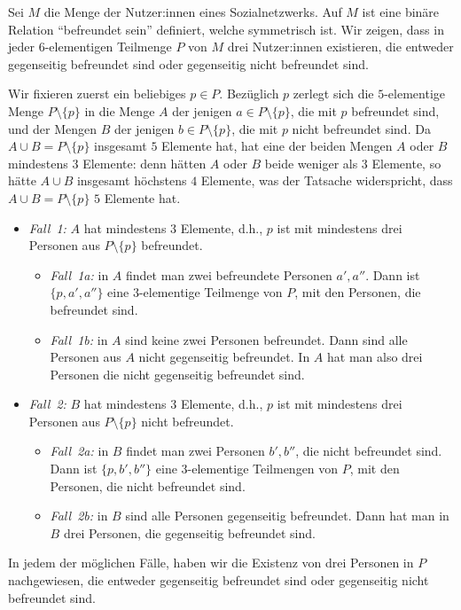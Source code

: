 \begin{bsp} 
	Sei $M$ die Menge der Nutzer:innen eines Sozialnetzwerks. Auf $M$ ist eine binäre Relation ``befreundet sein''  definiert, welche symmetrisch ist. Wir zeigen, dass in jeder $6$-elementigen Teilmenge $P$ von $M$ drei Nutzer:innen existieren, die entweder gegenseitig befreundet sind oder gegenseitig nicht befreundet sind. 
	
	Wir fixieren zuerst ein beliebiges $p \in P$. Bezüglich $p$ zerlegt sich die $5$-elementige Menge $P \setminus \{p\}$ in die Menge $A$ der jenigen $a \in P \setminus \{p\}$, die mit $p$ befreundet sind, und der Mengen $B$ der jenigen $b \in P \setminus \{p\}$, die mit $p$ nicht befreundet sind. Da $A \cup B = P \setminus \{p\}$ insgesamt $5$ Elemente hat, hat eine der beiden Mengen $A$ oder $B$ mindestens $3$ Elemente: denn hätten $A$ oder $B$ beide weniger als $3$ Elemente, so hätte $A \cup B$ insgesamt höchstens $4$ Elemente, was der Tatsache widerspricht, dass $A \cup B = P \setminus \{p\}$ $5$ Elemente hat. 
	
	\begin{itemize} 
		\item[] \emph{Fall~1:} $A$ hat mindestens $3$ Elemente, d.h., $p$ ist mit mindestens drei Personen aus  $P \setminus \{p\}$ befreundet. 
		\begin{itemize} 
			\item[] \emph{Fall~1a:}  in $A$ findet man zwei befreundete Personen $a', a''$. Dann ist $\{p,a',a''\}$ eine $3$-elementige Teilmenge von $P$, mit den Personen, die befreundet sind. 
			\item[] \emph{Fall~1b:} in $A$ sind  keine zwei Personen befreundet. Dann sind alle Personen aus $A$ nicht gegenseitig befreundet. In $A$ hat man also drei Personen die nicht gegenseitig befreundet sind. 
		\end{itemize} 
		\item[] \emph{Fall~2:} $B$ hat mindestens $3$ Elemente, d.h., $p$ ist mit mindestens drei Personen aus $P \setminus \{p\}$ nicht befreundet. 
		\begin{itemize} 
				\item[] \emph{Fall~2a:} in $B$ findet man zwei Personen $b',b''$, die nicht befreundet sind. Dann ist $\{p,b',b''\}$ eine $3$-elementige Teilmengen von $P$, mit den Personen, die nicht befreundet sind. 
				\item[] \emph{Fall~2b:} in $B$ sind alle Personen gegenseitig befreundet. Dann hat man in $B$ drei Personen, die gegenseitig befreundet sind. 
		\end{itemize} 
	\end{itemize} 
	In jedem der möglichen Fälle, haben wir die Existenz von drei Personen in $P$ nachgewiesen, die entweder gegenseitig befreundet sind oder gegenseitig nicht befreundet sind. 
\end{bsp} 

